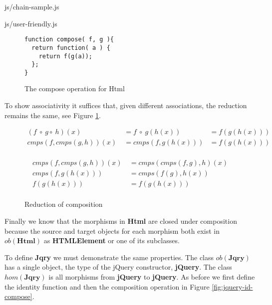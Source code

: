 \documentclass[preprint]{sigplanconf}
\begin{document}
\begin{lstinputlisting}[
    language=JavaScript,
    caption={Sources of Html objects},
    label={lst:chain-sample}
]{js/chain-sample.js}
\begin{lstinputlisting}[
    language=JavaScript,
    caption={User friendly overhead},
    label={lst:user-friendly}
]{js/user-friendly.js}
\begin{figure}[!ht]
\small
\begin{verbatim}
function compose( f, g ){
  return function( a ) {
    return f(g(a));
  };
}
\end{verbatim}
\nocaptionrule \caption{The compose operation for Html}
\end{figure}

To show associativity it suffices that, given different associations, the reduction remains the same, see Figure \ref{fig:html-associativity}.

\begin{figure}[!ht]
\begin{displaymath}
\begin{aligned}
(f\ \circ\ g \circ\ h)(x)\ &= f\ \circ\ g(h(x)) &= f(g(h(x)))\\
cmps(f,cmps(g,h))(x)\ &= cmps(f, g(h(x))) &= f(g(h(x)))\\
\end{aligned}
\end{displaymath}

\begin{displaymath}
\begin{aligned}
cmps(f,cmps(g,h))(x)\ &= cmps(cmps(f,g),h)(x) \\
cmps(f,g(h(x)))\ &= cmps(f(g),h(x)) \\
f(g(h(x)))\ &= f(g(h(x)))\\
\end{aligned}
\end{displaymath}
\nocaptionrule \caption{Reduction of composition}
\label{fig:html-associativity}
\end{figure}

Finally we know that the morphisms in \textbf{Html} are closed under composition because the source and target objects for each morphism both exist in \begin{math}ob(\mathbf{Html})\end{math} as \textbf{HTMLElement} or one of its subclasses.

To define \textbf{Jqry} we must demonstrate the same properties. The class \begin{math}ob(\mathbf{Jqry})\end{math} has a single object, the type of the jQuery constructor, \textbf{jQuery}. The class \begin{math}hom(\mathbf{Jqry})\end{math} is all morphisms from \textbf{jQuery} to \textbf{jQuery}. As before we first define the identity function and then the composition operation in Figure \ref{fig:jquery-id-compose}.


\end{lstinputlisting}
\end{lstinputlisting}
\end{document}
